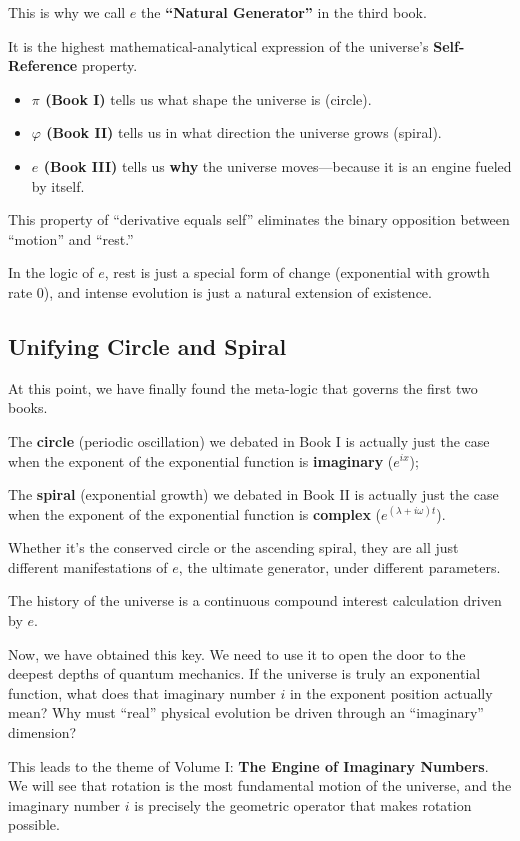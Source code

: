 This is why we call $e$ the \textbf{``Natural Generator''} in the third book.

It is the highest mathematical-analytical expression of the universe's \textbf{Self-Reference} property.

\begin{itemize}
\item \textbf{$\pi$ (Book I)} tells us what shape the universe is (circle).

\item \textbf{$\varphi$ (Book II)} tells us in what direction the universe grows (spiral).

\item \textbf{$e$ (Book III)} tells us \textbf{why} the universe moves---because it is an engine fueled by itself.
\end{itemize}

This property of ``derivative equals self'' eliminates the binary opposition between ``motion'' and ``rest.''

In the logic of $e$, rest is just a special form of change (exponential with growth rate 0), and intense evolution is just a natural extension of existence.

\subsection{Unifying Circle and Spiral}

At this point, we have finally found the meta-logic that governs the first two books.

The \textbf{circle} (periodic oscillation) we debated in Book I is actually just the case when the exponent of the exponential function is \textbf{imaginary} ($e^{ix}$);

The \textbf{spiral} (exponential growth) we debated in Book II is actually just the case when the exponent of the exponential function is \textbf{complex} ($e^{(\lambda+i\omega)t}$).

Whether it's the conserved circle or the ascending spiral, they are all just different manifestations of \textbf{$e$}, the ultimate generator, under different parameters.

The history of the universe is a continuous compound interest calculation driven by $e$.

Now, we have obtained this key. We need to use it to open the door to the deepest depths of quantum mechanics. If the universe is truly an exponential function, what does that imaginary number \textbf{$i$} in the exponent position actually mean? Why must ``real'' physical evolution be driven through an ``imaginary'' dimension?

This leads to the theme of Volume I: \textbf{The Engine of Imaginary Numbers}. We will see that rotation is the most fundamental motion of the universe, and the imaginary number $i$ is precisely the geometric operator that makes rotation possible.

